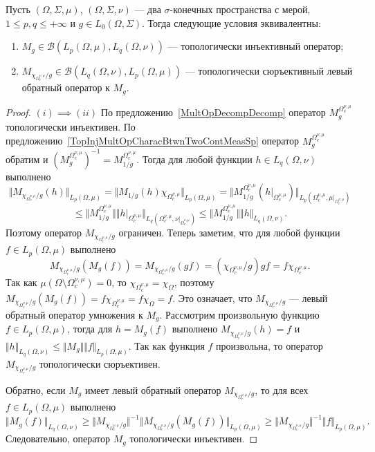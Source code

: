 \begin{proposition}\label{TopInjMultOpDescBtwnTwoMeasSp} Пусть
$(\Omega,\Sigma,\mu)$, $(\Omega,\Sigma,\nu)$ --- два $\sigma$-конечных
пространства с мерой, $1\leq p,q\leq +\infty$ и $g\in L_0(\Omega,\Sigma)$. Тогда
следующие условия эквивалентны:

\begin{enumerate}[label = (\roman*)]
    \item $M_g\in\mathcal{B}(L_p(\Omega,\mu),L_q(\Omega,\nu))$ --- топологически
    инъективный оператор;

    \item $M_{\chi_{\Omega_c^{\nu,\mu}}/g}\in\mathcal{B}(L_q(\Omega,\nu),
    L_p(\Omega,\mu))$ --- топологически сюръективный левый обратный оператор к
    $M_g$.
\end{enumerate}
\end{proposition}
\begin{proof}
$(i) \implies (ii)$ По предложению~\ref{MultOpDecompDecomp} оператор
$M_g^{\Omega_c^{\nu,\mu}}$ топологически инъективен. По
предложению~\ref{TopInjMultOpCharacBtwnTwoContMeasSp} оператор
$M_g^{\Omega_c^{\nu,\mu}}$ обратим и
${(M_g^{\Omega_c^{\nu,\mu}})}^{-1}=M_{1/g}^{\Omega_c^{\nu,\mu}}$. Тогда для любой
функции $h\in L_q(\Omega,\nu)$ выполнено
$$
\Vert M_{\chi_{\Omega_c^{\nu,\mu}}/g}(h)\Vert_{L_p(\Omega,\mu)}=
\Vert M_{1/g}(h)\chi_{\Omega_c^{\nu,\mu}}\Vert_{L_p(\Omega,\mu)}=
\Vert 
    M_{1/g}^{\Omega_c^{\nu,\mu}}(h|_{\Omega_c^{\nu,\mu}})
\Vert_{L_p(\Omega_c^{\nu,\mu},\mu|_{\Omega_c^{\nu,\mu}})}
$$
$$
\leq\Vert 
    M_{1/g}^{\Omega_c^{\nu,\mu}}
\Vert
\Vert 
    h|_{\Omega_c^{\nu,\mu}}
\Vert_{L_q(\Omega_c^{\nu,\mu},\nu|_{\Omega_c^{\nu,\mu}})}
\leq\Vert M_{1/g}^{\Omega_c^{\nu,\mu}}\Vert\Vert h\Vert_{L_q(\Omega,\nu)}.
$$ 
Поэтому оператор $M_{\chi_{\Omega_c^{\nu,\mu}}/g}$ ограничен. Теперь заметим,
что для любой функции $f\in L_p(\Omega,\mu)$ выполнено
$$
M_{\chi_{\Omega_c^{\nu,\mu}}/g}(M_g(f))
=M_{\chi_{\Omega_c^{\nu,\mu}}/g}(g  f)
=(\chi_{\Omega_c^{\nu,\mu}}/g)  g  f
=f \chi_{\Omega_c^{\nu,\mu}}.
$$
Так как $\mu(\Omega\setminus\Omega_c^{\nu,\mu})=0$, то
$\chi_{\Omega_c^{\nu,\mu}}=\chi_{\Omega}$, поэтому
$M_{\chi_{\Omega_c^{\nu,\mu}}/g}(M_g(f))
=f \chi_{\Omega_c^{\nu,\mu}}
=f\chi_{\Omega}=f$. Это означает, 
что $M_{\chi_{\Omega_c^{\nu,\mu}}/g}$ --- левый обратный оператор умножения 
к $M_g$. Рассмотрим произвольную функцию $f\in L_p(\Omega,\mu)$, 
тогда для $h=M_g(f)$ выполнено $M_{\chi_{\Omega_c^{\nu,\mu}}/g}(h)=f$ и 
$\Vert h\Vert_{L_q(\Omega,\nu)}
\leq\Vert M_g\Vert\Vert f\Vert_{L_p(\Omega,\mu)}$. 
Так как функция $f$ произвольна, то оператор $M_{\chi_{\Omega_c^{\nu,\mu}}/g}$
топологически сюръективен.

Обратно, если $M_g$ имеет левый обратный оператор
$M_{\chi_{\Omega_c^{\nu,\mu}}/g}$, то для всех $f\in L_p(\Omega,\mu)$ выполнено
$$
\Vert M_g(f)\Vert_{L_q(\Omega,\nu)}
\geq\Vert 
    M_{\chi_{\Omega_c^{\nu,\mu}}/g}
\Vert^{-1}
\Vert 
    M_{\chi_{\Omega_c^{\nu,\mu}}/g}(M_g(f))
\Vert_{L_p(\Omega,\mu)}
\geq\Vert 
    M_{\chi_{\Omega_c^{\nu,\mu}}/g}
\Vert^{-1}
\Vert f\Vert_{L_p(\Omega,\mu)}.
$$
Следовательно, оператор $M_g$ топологически инъективен.
\end{proof}


